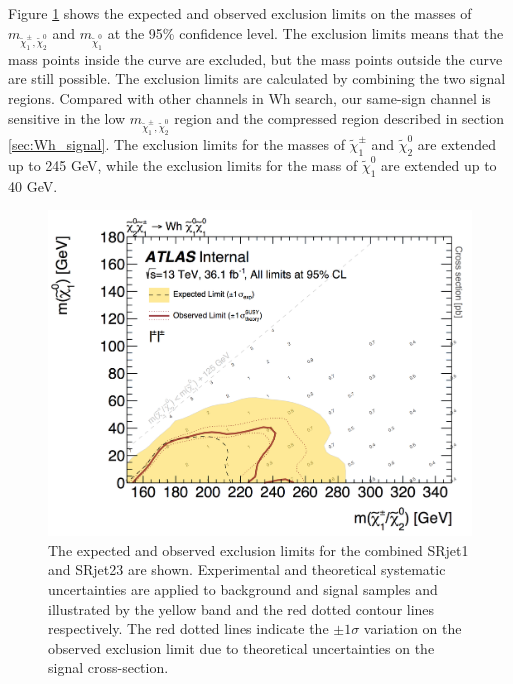 Figure \ref{fig:result_exclusion_limit} shows the expected and observed exclusion limits on the masses of $m_{\tilde{\chi}_1^\pm, \tilde{\chi}_2^0}$ and $m_{\tilde{\chi}_1^0}$ at the 95\% confidence level.
The exclusion limits means that the mass points inside the curve are excluded, but the mass points outside the curve are still possible.
The exclusion limits are calculated by combining the two signal regions.
Compared with other channels in Wh search, our same-sign channel is sensitive in the low $m_{\tilde{\chi}_1^\pm, \tilde{\chi}_2^0}$ region and the compressed region described in section \ref{sec:Wh_signal}.
The exclusion limits for the masses of $\tilde{\chi}_1^\pm$ and $\tilde{\chi}_2^0$ are extended up to 245 GeV, while the exclusion limits for the mass of $\tilde{\chi}_1^0$ are extended up to 40 GeV.

\begin{figure}[htbp]
\centering
\includegraphics[width=\textwidth]{data/plot/HistFitterResults/contourPlotterWhSS_SigExt.png}
\caption{The expected and observed exclusion limits for the combined SRjet1 and SRjet23 are shown. Experimental and theoretical systematic uncertainties are applied to background and signal samples and illustrated by the yellow band and the red dotted contour lines respectively. The red dotted lines indicate the $\pm 1 \sigma$ variation on the observed exclusion limit due to theoretical uncertainties on the signal cross-section.}
\label{fig:result_exclusion_limit}
\end{figure}

%


